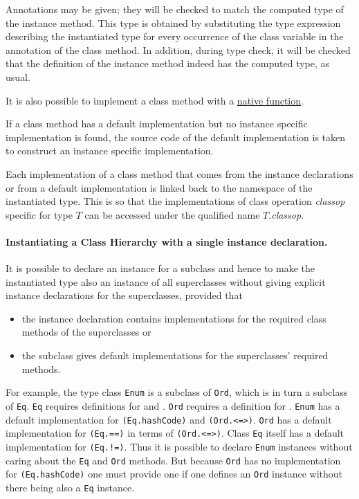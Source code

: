 Annotations may be given; they will be checked to match the computed type of the instance method.
This type is obtained by substituting the type expression describing the instantiated type for every occurrence of the class variable in the annotation of the class method. In addition, during type check, it will be checked that the definition of the instance method indeed has the computed type, as usual.

It is also possible to implement a class method with a \hyperref[nativefun]{native function}.

If a class method has a default implementation but no instance specific implementation is found, the source code of the default implementation is taken to construct an instance specific implementation.

Each implementation of a class method that comes from the instance declarations or from a default implementation is linked back to the namespace of the instantiated type. This is so that the implementations of class operation \emph{classop} specific for type $T$ can be accessed under the qualified name $T$.\emph{classop}.


\paragraph{Instantiating a Class Hierarchy with a single instance declaration.} It is possible to declare an instance for a subclass and hence to make the instantiated type also an instance of all superclasses without giving explicit instance declarations for the superclasses, provided that
\begin{itemize}
\item the instance declaration contains implementations for the required class methods of the superclasses or
\item the subclass gives default implementations for the superclasses' required methods.
\end{itemize}
For example, the type class \texttt{Enum} is a subclass of \texttt{Ord}, which is in turn a subclass of \texttt{Eq}.
\texttt{Eq} requires definitions for  and \term{==}.
\texttt{Ord} requires a definition for  \term{<=>}.
\texttt{Enum} has a default implementation for \texttt{(Eq.hashCode)} and \texttt{(Ord.<=>)}.
\texttt{Ord} has a default implementation for \texttt{(Eq.==)} in terms of \texttt{(Ord.<=>)}.
Class \texttt{Eq} itself has a default implementation for \texttt{(Eq.!=)}.
Thus it is possible to declare  \texttt{Enum} instances without caring about the \texttt{Eq} and \texttt{Ord} methods.
But because \texttt{Ord} has no implementation for \texttt{(Eq.hashCode)} one must provide one if one defines an \texttt{Ord} instance without there being also a \texttt{Eq} instance.

